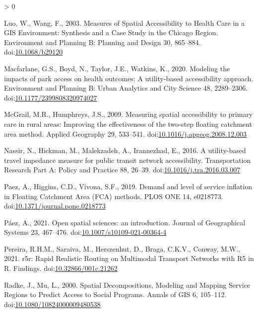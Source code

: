 \documentclass[]{elsarticle} %
\newlength{\cslhangindent}
\newenvironment{CSLReferences}[2] %
 {%
  \setlength{\parindent}{0pt}
  \ifodd #1 \everypar{\setlength{\hangindent}{\cslhangindent}}\ignorespaces\fi
  \ifnum #2 > 0
  \setlength{\parskip}{#2\baselineskip}
  \fi
 }%
 {}
\begin{document}
\begin{CSLReferences}{1}{0}
\leavevmode\hypertarget{ref-luo2003}{}%
Luo, W., Wang, F., 2003. Measures of Spatial Accessibility to Health
Care in a GIS Environment: Synthesis and a Case Study in the Chicago
Region. Environment and Planning B: Planning and Design 30, 865--884.
doi:\href{https://doi.org/10.1068/b29120}{10.1068/b29120}

\leavevmode\hypertarget{ref-macfarlane2020}{}%
Macfarlane, G.S., Boyd, N., Taylor, J.E., Watkins, K., 2020. Modeling
the impacts of park access on health outcomes: A utility-based
accessibility approach. Environment and Planning B: Urban Analytics and
City Science 48, 2289--2306.
doi:\href{https://doi.org/10.1177/2399808320974027}{10.1177/2399808320974027}

\leavevmode\hypertarget{ref-mcgrail2009}{}%
McGrail, M.R., Humphreys, J.S., 2009. Measuring spatial accessibility to
primary care in rural areas: Improving the effectiveness of the two-step
floating catchment area method. Applied Geography 29, 533--541.
doi:\href{https://doi.org/10.1016/j.apgeog.2008.12.003}{10.1016/j.apgeog.2008.12.003}

\leavevmode\hypertarget{ref-nassir2016}{}%
Nassir, N., Hickman, M., Malekzadeh, A., Irannezhad, E., 2016. A
utility-based travel impedance measure for public transit network
accessibility. Transportation Research Part A: Policy and Practice 88,
26--39.
doi:\href{https://doi.org/10.1016/j.tra.2016.03.007}{10.1016/j.tra.2016.03.007}

\leavevmode\hypertarget{ref-paez2019}{}%
Paez, A., Higgins, C.D., Vivona, S.F., 2019. Demand and level of service
inflation in Floating Catchment Area (FCA) methods. PLOS ONE 14,
e0218773.
doi:\href{https://doi.org/10.1371/journal.pone.0218773}{10.1371/journal.pone.0218773}

\leavevmode\hypertarget{ref-paez2021}{}%
Páez, A., 2021. Open spatial sciences: an introduction. Journal of
Geographical Systems 23, 467--476.
doi:\href{https://doi.org/10.1007/s10109-021-00364-4}{10.1007/s10109-021-00364-4}

\leavevmode\hypertarget{ref-pereira2021}{}%
Pereira, R.H.M., Saraiva, M., Herszenhut, D., Braga, C.K.V., Conway,
M.W., 2021. r5r: Rapid Realistic Routing on Multimodal Transport
Networks with R5 in R. Findings.
doi:\href{https://doi.org/10.32866/001c.21262}{10.32866/001c.21262}

\leavevmode\hypertarget{ref-radke2000}{}%
Radke, J., Mu, L., 2000. Spatial Decompositions, Modeling and Mapping
Service Regions to Predict Access to Social Programs. Annals of GIS 6,
105--112.
doi:\href{https://doi.org/10.1080/10824000009480538}{10.1080/10824000009480538}


\end{CSLReferences}
\end{document}
